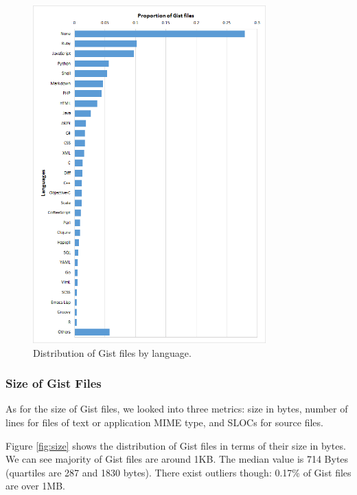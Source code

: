 \begin{figure}[!htbp]
	\centering
	\includegraphics[width=0.8\textwidth]{figures/languageDistribution.png}
	\caption{Distribution of Gist files by language.}
	\label{fig:languageDist}
\end{figure}

\subsubsection{Size of Gist Files}
As for the size of Gist files, we looked into three metrics: size in bytes, number of lines for files of text or application MIME type, and SLOCs for source files. 

Figure \ref{fig:size} shows the distribution of Gist files in terms of their size in bytes. We can see majority of Gist files are around 1KB. The median value is 714 Bytes (quartiles are 287 and 1830 bytes). There exist outliers though: 0.17\% of Gist files are over 1MB.

